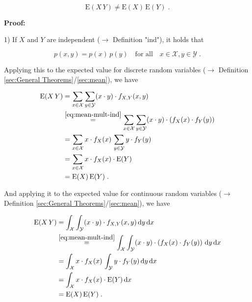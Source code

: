 \documentclass[a4paper,12pt]{book}
\begin{document}
\begin{equation} \label{eq:mean-mult-mean-nonmult}
\mathrm{E}(X\,Y) \neq \mathrm{E}(X) \, \mathrm{E}(Y) \; .
\end{equation}


\vspace{1em}
\textbf{Proof:}

1) If $X$ and $Y$ are independent ($\rightarrow$ Definition "ind"), it holds that

\begin{equation} \label{eq:mean-mult-ind}
p(x,y) = p(x) \, p(y) \quad \text{for all} \quad x \in \mathcal{X}, y \in \mathcal{Y} \; .
\end{equation}

Applying this to the expected value for discrete random variables ($\rightarrow$ Definition \ref{sec:General Theorems}/\ref{sec:mean}), we have

\begin{equation} \label{eq:mean-mult-mean-mult-disc}
\begin{split}
\mathrm{E}(X\,Y) &= \sum_{x \in \mathcal{X}} \sum_{y \in \mathcal{Y}} (x \cdot y) \cdot f_{X,Y}(x,y) \\
&\overset{\eqref{eq:mean-mult-ind}}{=} \sum_{x \in \mathcal{X}} \sum_{y \in \mathcal{Y}} (x \cdot y) \cdot \left( f_X(x) \cdot f_Y(y) \right) \\
&= \sum_{x \in \mathcal{X}} x \cdot f_X(x) \, \sum_{y \in \mathcal{Y}} y \cdot f_Y(y) \\
&= \sum_{x \in \mathcal{X}} x \cdot f_X(x) \cdot \mathrm{E}(Y) \\
&= \mathrm{E}(X) \, \mathrm{E}(Y) \; . \\
\end{split}
\end{equation}

And applying it to the expected value for continuous random variables ($\rightarrow$ Definition \ref{sec:General Theorems}/\ref{sec:mean}), we have

\begin{equation} \label{eq:mean-mult-mean-mult-cont}
\begin{split}
\mathrm{E}(X\,Y) &= \int_{\mathcal{X}} \int_{\mathcal{Y}} (x \cdot y) \cdot f_{X,Y}(x,y) \, \mathrm{d}y \, \mathrm{d}x \\
&\overset{\eqref{eq:mean-mult-ind}}{=} \int_{\mathcal{X}} \int_{\mathcal{Y}} (x \cdot y) \cdot \left( f_X(x) \cdot f_Y(y) \right) \, \mathrm{d}y \, \mathrm{d}x \\
&= \int_{\mathcal{X}} x \cdot f_X(x) \, \int_{\mathcal{Y}} y \cdot f_Y(y)  \, \mathrm{d}y \, \mathrm{d}x \\
&= \int_{\mathcal{X}} x \cdot f_X(x) \cdot \mathrm{E}(Y) \, \mathrm{d}x \\
&= \mathrm{E}(X) \, \mathrm{E}(Y) \; . \\
\end{split}
\end{equation}
\end{document}
